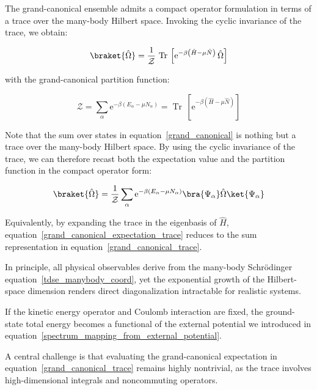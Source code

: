 The grand-canonical ensemble admits a compact operator formulation in terms of a trace over the many-body Hilbert space.
Invoking the cyclic invariance of the trace, we obtain:

\begin{equation}
    \braket{\hat{\Omega}}
    = \frac{1}{\mathcal{Z}}\,\operatorname{Tr}\,\left[\mathrm{e}^{-\beta\left(\hat{H}-\mu \hat{N}\right)}\,\hat{\Omega}\right]
\label{grand_canonical_expectation_trace}
\end{equation}

with the grand-canonical partition function:

\begin{equation}
    \mathcal{Z}
    =\sum_{\alpha}\mathrm{e}^{-\beta\left(E_{\alpha}-\mu N_{\alpha}\right)} 
    =\operatorname{Tr}\,\left[\mathrm{e}^{-\beta\left(\hat{H}-\mu \hat{N}\right)}\right]
\label{grand_partition_function_trace}
\end{equation}

Note that the sum over states in equation~\eqref{grand_canonical} is nothing but a trace over the many-body Hilbert space.  By using the cyclic invariance of the trace, we can therefore recast both the expectation value and the partition function in the compact operator form:

\begin{equation}
    \braket{\hat\Omega}
    = \frac{1}{\mathcal{Z}}\sum_\alpha \mathrm{e}^{-\beta(E_\alpha-\mu N_\alpha)}\bra{\Psi_\alpha}\hat\Omega\ket{\Psi_\alpha} 
\label{grand_canonical_trace}
\end{equation}

Equivalently, by expanding the trace in the eigenbasis of $\hat{H}$, equation~\eqref{grand_canonical_expectation_trace} reduces to the sum representation in equation~\eqref{grand_canonical_trace}.

In principle, all physical observables derive from the many-body Schrödinger equation~\eqref{tdse_manybody_coord}, yet the exponential growth of the Hilbert-space dimension renders direct diagonalization intractable for realistic systems.

If the kinetic energy operator and Coulomb interaction are fixed, the ground-state total energy becomes a functional of the external potential we introduced in equation~\eqref{spectrum_mapping_from_external_potential}.

A central challenge is that evaluating the grand-canonical expectation in equation~\eqref{grand_canonical_trace} remains highly nontrivial, as the trace involves high-dimensional integrals and noncommuting operators.

